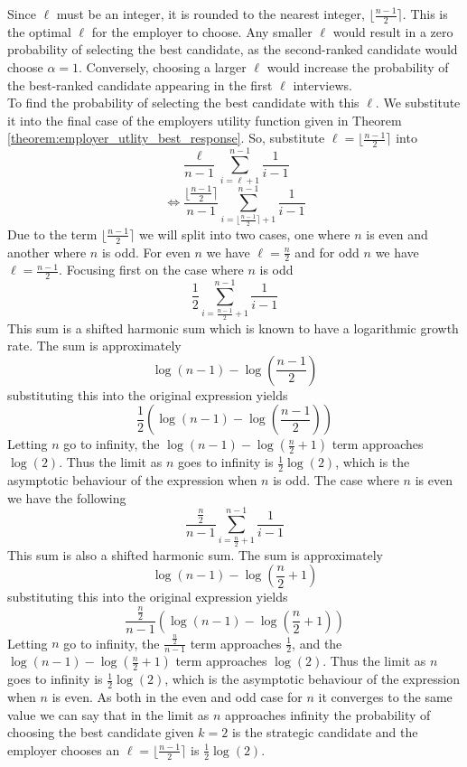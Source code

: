 \documentclass{article}
\begin{document}
Since $\ell$ must be an integer, it is rounded to the nearest integer, $\lfloor \frac{n-1}{2} \rceil$. This is the optimal $\ell$ for the employer to choose. Any smaller $\ell$ would result in a zero probability of selecting the best candidate, as the second-ranked candidate would choose $\alpha=1$. Conversely, choosing a larger $\ell$ would increase the probability of the best-ranked candidate appearing in the first $\ell$ interviews.
\\[2ex]
To find the probability of selecting the best candidate with this $\ell$. We substitute it into the final case of the employers utility function given in Theorem \ref{theorem:employer_utlity_best_response}. So, substitute $\ell = \lfloor \frac{n-1}{2} \rceil$ into
$$ \frac{\ell}{n-1}\sum_{i = \ell + 1}^{n-1}\frac{1}{i-1} $$
$$ \iff \frac{\lfloor \frac{n-1}{2} \rceil}{n-1}\sum_{i = \lfloor \frac{n-1}{2} \rceil + 1}^{n-1}\frac{1}{i-1} $$
Due to the term $\lfloor \frac{n-1}{2} \rceil$ we will split into two cases, one where $n$ is even and another where $n$ is odd. For even $n$ we have $\ell = \frac{n}{2}$ and for odd $n$ we have $\ell = \frac{n-1}{2}$.
Focusing first on the case where $n$ is odd
$$ \frac{1}{2}\sum_{i = \frac{n-1}{2} + 1}^{n-1}\frac{1}{i-1} $$
This sum is a shifted harmonic sum which is known to have a logarithmic growth rate. The sum is approximately 
$$ \log(n-1) - \log(\frac{n-1}{2}) $$
substituting this into the original expression yields 
$$ \frac{1}{2} (\log(n-1) - \log(\frac{n-1}{2})) $$
Letting $n$ go to infinity, the $\log(n-1) - \log(\frac{n}{2} + 1)$ term approaches $\log(2)$. Thus the limit as $n$ goes to infinity is $\frac{1}{2}\log(2)$, which is the asymptotic behaviour of the expression when $n$ is odd.
The case where $n$ is even we have the following 
$$ \frac{\frac{n}{2}}{n-1}\sum_{i = \frac{n}{2} + 1}^{n-1}\frac{1}{i-1} $$
This sum is also a shifted harmonic sum. The sum is approximately 
$$ \log(n-1) - \log(\frac{n}{2} + 1) $$ 
substituting this into the original expression yields 
$$ \frac{\frac{n}{2}}{n-1} (\log(n-1) - \log(\frac{n}{2} + 1)) $$
Letting $n$ go to infinity, the $\frac{\frac{n}{2}}{n-1}$ term approaches $\frac{1}{2}$, and the $\log(n-1) - \log(\frac{n}{2} + 1)$ term approaches $\log(2)$. Thus the limit as $n$ goes to infinity is $\frac{1}{2}\log(2)$, which is the asymptotic behaviour of the expression when $n$ is even. As both in the even and odd case for $n$ it converges to the same value we can say that in the limit as $n$ approaches infinity the probability of choosing the best candidate given $k=2$ is the strategic candidate and the employer chooses an $\ell = \lfloor \frac{n-1}{2} \rceil$ is $\frac{1}{2}\log(2)$.
\end{document}
